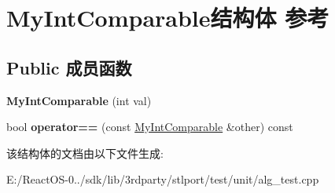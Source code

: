 \hypertarget{struct_my_int_comparable}{}\section{My\+Int\+Comparable结构体 参考}
\label{struct_my_int_comparable}
\subsection*{Public 成员函数}
\begin{DoxyCompactItemize}
\item 
\mbox{\label{struct_my_int_comparable_a236a0e4b9b51aea0b8f4b1c5213c2f84}} 
{\bfseries My\+Int\+Comparable} (int val)
\item 
\mbox{\label{struct_my_int_comparable_adf4bf24db48763c23870755e9766a82a}} 
bool {\bfseries operator==} (const \hyperlink{struct_my_int_comparable}{My\+Int\+Comparable} \&other) const
\end{DoxyCompactItemize}


该结构体的文档由以下文件生成\+:\begin{DoxyCompactItemize}
\item 
E\+:/\+React\+O\+S-\/0../sdk/lib/3rdparty/stlport/test/unit/alg\+\_\+test.\+cpp\end{DoxyCompactItemize}

